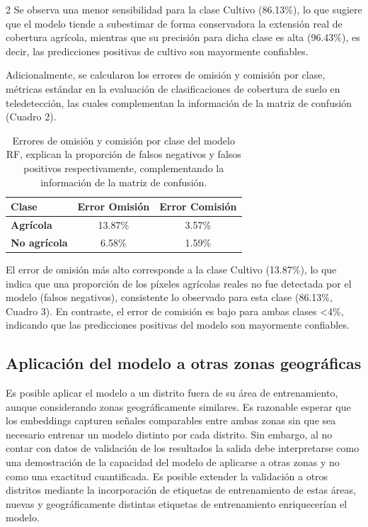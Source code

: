 \begin{multicols}{2}
      Se observa una menor sensibilidad para la clase Cultivo (86.13\%), lo que sugiere que el modelo tiende a subestimar de forma conservadora la extensión real de cobertura agrícola, mientras que su precisión para dicha clase es alta (96.43\%), es decir, las predicciones positivas de cultivo son mayormente confiables.

      Adicionalmente, se calcularon los errores de omisión y comisión por clase, métricas estándar en la evaluación de clasificaciones de cobertura de suelo en teledetección, las cuales complementan la información de la matriz de confusión (Cuadro 2).

      \begin{table}[H]
        \centering
        \scriptsize
        \setlength{\tabcolsep}{4pt}
        \renewcommand{\arraystretch}{1.3}
        \begin{tabular}{lcc}
          \hline
          \textbf{Clase} & \textbf{Error Omisión} & \textbf{Error Comisión} \\
          \hline
          \textbf{Agrícola}     & 13.87\% & 3.57\%  \\
          \textbf{No agrícola}  & 6.58\%  & 1.59\%  \\
          \hline
        \end{tabular}
        \caption{Errores de omisión y comisión por clase del modelo RF, explican la proporción de falsos negativos y falsos positivos respectivamente, complementando la información de la matriz de confusión.}
        \label{tab:errores-omision-comision}
      \end{table}

      El error de omisión más alto corresponde a la clase Cultivo (13.87\%), lo que indica que una proporción de los píxeles agrícolas reales no fue detectada por el modelo (falsos negativos), consistente lo observado para esta clase (86.13\%, Cuadro 3). En contraste, el error de comisión es bajo para ambas clases <4\%, indicando que las predicciones positivas del modelo son mayormente confiables.

      \subsection{Aplicación del modelo a otras zonas geográficas}

      Es posible aplicar el modelo a un distrito fuera de su área de entrenamiento, aunque considerando zonas geográficamente similares. Es razonable esperar que los embeddings capturen señales comparables entre ambas zonas sin que sea necesario entrenar un modelo distinto por cada distrito. Sin embargo, al no contar con datos de validación de los resultados la salida debe interpretarse como una demostración de la capacidad del modelo de aplicarse a otras zonas y no como una exactitud cuantificada. Es posible extender la validación a otros distritos mediante la incorporación de etiquetas de entrenamiento de estas áreas, nuevas y geográficamente distintas etiquetas de entrenamiento enriquecerían el modelo.


\end{multicols}

